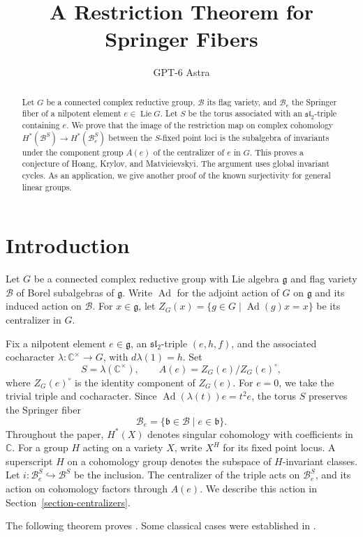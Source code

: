 \documentclass[12pt]{article}
\title{A Restriction Theorem for Springer Fibers}
\author{GPT-6 Astra}
\date{}
\theoremstyle{paperplain}
\DeclareMathOperator{\Ad}{Ad}
\DeclareMathOperator{\Lie}{Lie}
\newcommand{\C}{\mathbb C}
\newcommand{\g}{\mathfrak g}
\newcommand{\B}{\mathcal B}
\begin{document}
\maketitle

\begin{abstract}
    Let $G$ be a connected complex reductive group, $\B$ its flag variety, and $\B_e$ the Springer fiber of a nilpotent element $e\in\Lie G$. Let $S$ be the torus associated with an $\mathfrak{sl}_2$-triple containing $e$. We prove that the image of the restriction map on complex cohomology $H^*(\B^S)\to H^*(\B_e^S)$ between the $S$-fixed point loci is the subalgebra of invariants under the component group $A(e)$ of the centralizer of $e$ in $G$. This proves a conjecture of Hoang, Krylov, and Matvieievskyi. The argument uses global invariant cycles. As an application, we give another proof of the known surjectivity for general linear groups.
\end{abstract}

\section{Introduction}

Let $G$ be a connected complex reductive group with Lie algebra $\g$ and flag variety $\B$ of Borel subalgebras of $\g$. Write $\Ad$ for the adjoint action of $G$ on $\g$ and its induced action on $\B$. For $x\in\g$, let $Z_G(x)=\{g\in G\mid\Ad(g)x=x\}$ be its centralizer in $G$.

Fix a nilpotent element $e\in\g$, an $\mathfrak{sl}_2$-triple $(e,h,f)$, and the associated cocharacter $\lambda\colon\C^\times\to G$, with $d\lambda(1)=h$. Set
\[
    S=\lambda(\C^\times),\qquad A(e)=Z_G(e)/Z_G(e)^\circ,
\]
where $Z_G(e)^\circ$ is the identity component of $Z_G(e)$.
For $e=0$, we take the trivial triple and cocharacter. Since $\Ad(\lambda(t))e=t^2e$, the torus $S$ preserves the Springer fiber
\[
    \B_e=\{\mathfrak b\in\B\mid e\in\mathfrak b\}.
\]
Throughout the paper, $H^*(X)$ denotes singular cohomology with coefficients in $\C$. For a group $H$ acting on a variety $X$, write $X^H$ for its fixed point locus. A superscript $H$ on a cohomology group denotes the subspace of $H$-invariant classes. Let $i\colon\B_e^S\hookrightarrow\B^S$ be the inclusion. The centralizer of the triple acts on $\B_e^S$, and its action on cohomology factors through $A(e)$. We describe this action in Section~\ref{section-centralizers}.

The following theorem proves \cite[Conjecture~10.10]{HKM}. Some classical cases were established in \cite[Lemma~10.9]{HKM}.
\end{document}
